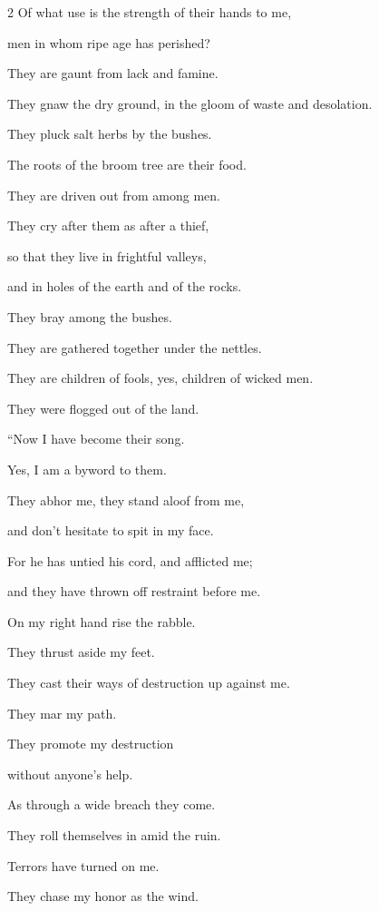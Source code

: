 \begin{multicols}{2}
	\myverse{}Of what use is the strength of their hands to me,
	
	men in whom ripe age has perished?
	
	\myverse{}They are gaunt from lack and famine.
	
	They gnaw the dry ground, in the gloom of waste and desolation.
	
	\myverse{}They pluck salt herbs by the bushes.
	
	The roots of the broom tree are their food.
	
	\myverse{}They are driven out from among men.
	
	They cry after them as after a thief,
	
	\myverse{}so that they live in frightful valleys,
	
	and in holes of the earth and of the rocks.
	
	\myverse{}They bray among the bushes.
	
	They are gathered together under the nettles.
	
	\myverse{}They are children of fools, yes, children of wicked men.
	
	They were flogged out of the land.
	
		\vspace{\baselineskip}
	
	\myverse{}“Now I have become their song.
	
	Yes, I am a byword to them.
	
	\myverse{}They abhor me, they stand aloof from me,
	
	and don’t hesitate to spit in my face.
	
	\myverse{}For he has untied his cord, and afflicted me;
	
	and they have thrown off restraint before me.
	
	\myverse{}On my right hand rise the rabble.
	
	They thrust aside my feet.
	
	They cast their ways of destruction up against me.
	
	\myverse{}They mar my path.
	
	They promote my destruction
	
	without anyone’s help.
	
	\myverse{}As through a wide breach they come.
	
	They roll themselves in amid the ruin.
	
	\myverse{}Terrors have turned on me.
	
	They chase my honor as the wind.
	

\end{multicols}
